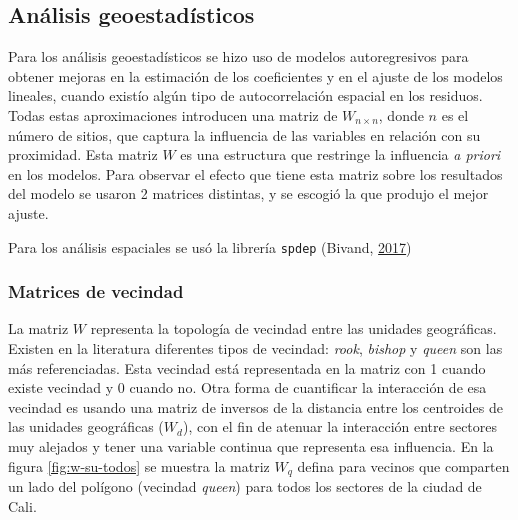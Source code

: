 \documentclass[12pt,a4paper,openany]{book}
\theoremstyle{definition}
\theoremstyle{definition}
\theoremstyle{definition}
\theoremstyle{remark}
\begin{document}
\subsection{Análisis geoestadísticos}\label{geostat}

Para los análisis geoestadísticos se hizo uso de modelos autoregresivos
para obtener mejoras en la estimación de los coeficientes y en el ajuste
de los modelos lineales, cuando existío algún tipo de autocorrelación
espacial en los residuos. Todas estas aproximaciones introducen una
matriz de \(W_{n \times n}\), donde \(n\) es el número de sitios, que
captura la influencia de las variables en relación con su proximidad.
Esta matriz \(W\) es una estructura que restringe la influencia \emph{a
priori} en los modelos. Para observar el efecto que tiene esta matriz
sobre los resultados del modelo se usaron 2 matrices distintas, y se
escogió la que produjo el mejor ajuste.

Para los análisis espaciales se usó la librería \texttt{spdep} (Bivand,
\protect\hyperlink{ref-R-spdep}{2017})

\subsubsection{Matrices de vecindad}\label{matrices-de-vecindad}

La matriz \(W\) representa la topología de vecindad entre las unidades
geográficas. Existen en la literatura diferentes tipos de vecindad:
\emph{rook}, \emph{bishop} y \emph{queen} son las más referenciadas.
Esta vecindad está representada en la matriz con 1 cuando existe
vecindad y 0 cuando no. Otra forma de cuantificar la interacción de esa
vecindad es usando una matriz de inversos de la distancia entre los
centroides de las unidades geográficas (\(W_d\)), con el fin de atenuar
la interacción entre sectores muy alejados y tener una variable continua
que representa esa influencia. En la figura \ref{fig:w-su-todos} se
muestra la matriz \(W_q\) defina para vecinos que comparten un lado del
polígono (vecindad \emph{queen}) para todos los sectores de la ciudad de
Cali.
\end{document}

